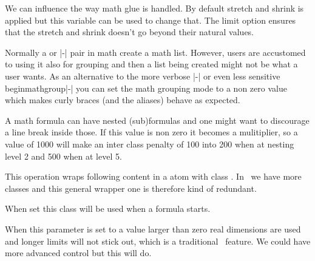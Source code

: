 We can influence the way math glue is handled. By default stretch and shrink is applied but
this variable can be used to change that. The limit option ensures that the stretch and shrink
doesn't go beyond their natural values.


\stopnewprimitive

\startnewprimitive[title={\prm {mathgroupingmode}}]

Normally a \type {{}} or \type {\bgroup}|-|\type {\egroup} pair in math create a
math list. However, users are accustomed to using it also for grouping and then a
list being created might not be what a user wants. As an alternative to the more
verbose |-| or even less sensitive \prm
{beginmathgroup}|-| you can set the math grouping mode to a
non zero value which makes curly braces (and the aliases) behave as expected.

\stopnewprimitive

\startnewprimitive[title={\prm {mathinlinepenaltyfactor}}]

A math formula can have nested (sub)formulas and one might want to discourage a
line break inside those. If this value is non zero it becomes a mulitiplier, so a
value of 1000 will make an inter class penalty of 100 into 200 when at nesting
level 2 and 500 when at level 5.

\stopnewprimitive

\startoldprimitive[title={\prm {mathinner}}]

This operation wraps following content in a atom with class . In
\LUAMETATEX\ we have more classes and this general wrapper one is therefore kind
of redundant.

\stopoldprimitive

\startnewprimitive[title={\prm {mathleftclass}}]

When set this class will be used when a formula starts.

\stopnewprimitive

\startnewprimitive[title={\prm {mathlimitsmode}}]

When this parameter is set to a value larger than zero real dimensions are used
and longer limits will not stick out, which is a traditional \TEX\ feature. We
could have more advanced control but this will do.

